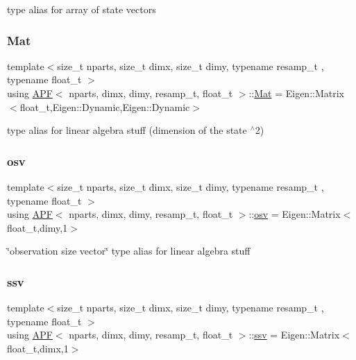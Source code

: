 type alias for array of state vectors \mbox{\label{classAPF_a448066ff44c8afb24c89bcea11d604c6}} 
\subsubsection{\texorpdfstring{Mat}{Mat}}
{\footnotesize\ttfamily template$<$size\+\_\+t nparts, size\+\_\+t dimx, size\+\_\+t dimy, typename resamp\+\_\+t , typename float\+\_\+t $>$ \\
using \hyperlink{classAPF}{A\+PF}$<$ nparts, dimx, dimy, resamp\+\_\+t, float\+\_\+t $>$\+::\hyperlink{classAPF_a448066ff44c8afb24c89bcea11d604c6}{Mat} =  Eigen\+::\+Matrix$<$float\+\_\+t,Eigen\+::\+Dynamic,Eigen\+::\+Dynamic$>$}

type alias for linear algebra stuff (dimension of the state $^\wedge$2) \mbox{\label{classAPF_aa8ac25c475e54ddf21999f28727a049e}} 
\subsubsection{\texorpdfstring{osv}{osv}}
{\footnotesize\ttfamily template$<$size\+\_\+t nparts, size\+\_\+t dimx, size\+\_\+t dimy, typename resamp\+\_\+t , typename float\+\_\+t $>$ \\
using \hyperlink{classAPF}{A\+PF}$<$ nparts, dimx, dimy, resamp\+\_\+t, float\+\_\+t $>$\+::\hyperlink{classAPF_aa8ac25c475e54ddf21999f28727a049e}{osv} =  Eigen\+::\+Matrix$<$float\+\_\+t,dimy,1$>$}

\char`\"{}observation size vector\char`\"{} type alias for linear algebra stuff \mbox{\label{classAPF_a5f96da87f00ff75af1232f9021daf06a}} 
\subsubsection{\texorpdfstring{ssv}{ssv}}
{\footnotesize\ttfamily template$<$size\+\_\+t nparts, size\+\_\+t dimx, size\+\_\+t dimy, typename resamp\+\_\+t , typename float\+\_\+t $>$ \\
using \hyperlink{classAPF}{A\+PF}$<$ nparts, dimx, dimy, resamp\+\_\+t, float\+\_\+t $>$\+::\hyperlink{classAPF_a5f96da87f00ff75af1232f9021daf06a}{ssv} =  Eigen\+::\+Matrix$<$float\+\_\+t,dimx,1$>$}

